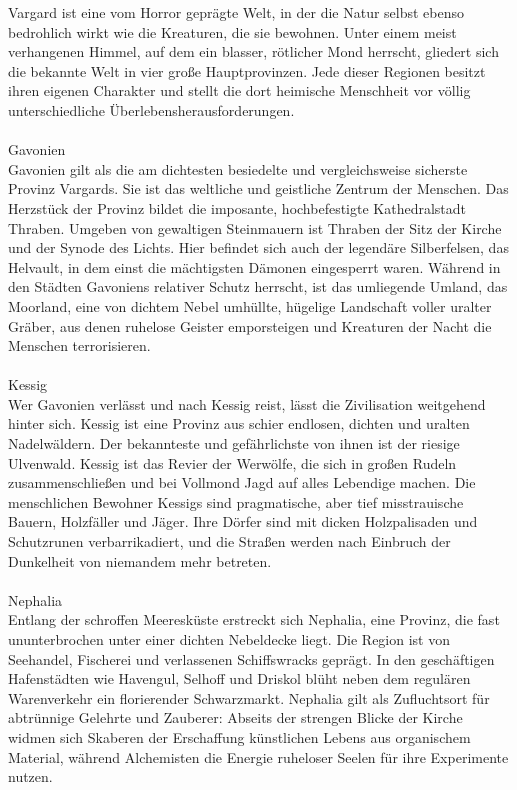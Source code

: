 \documentclass{book}
\begin{document}
Vargard ist eine vom Horror geprägte Welt, in der die Natur selbst ebenso bedrohlich wirkt wie die Kreaturen, die sie bewohnen. Unter einem meist verhangenen Himmel, auf dem ein blasser, rötlicher Mond herrscht, gliedert sich die bekannte Welt in vier große Hauptprovinzen. Jede dieser Regionen besitzt ihren eigenen Charakter und stellt die dort heimische Menschheit vor völlig unterschiedliche Überlebensherausforderungen.\\
\\
Gavonien\\
Gavonien gilt als die am dichtesten besiedelte und vergleichsweise sicherste Provinz Vargards. Sie ist das weltliche und geistliche Zentrum der Menschen. Das Herzstück der Provinz bildet die imposante, hochbefestigte Kathedralstadt Thraben. Umgeben von gewaltigen Steinmauern ist Thraben der Sitz der Kirche und der Synode des Lichts. Hier befindet sich auch der legendäre Silberfelsen, das Helvault, in dem einst die mächtigsten Dämonen eingesperrt waren. Während in den Städten Gavoniens relativer Schutz herrscht, ist das umliegende Umland, das Moorland, eine von dichtem Nebel umhüllte, hügelige Landschaft voller uralter Gräber, aus denen ruhelose Geister emporsteigen und Kreaturen der Nacht die Menschen terrorisieren.\\
\\
Kessig\\
Wer Gavonien verlässt und nach Kessig reist, lässt die Zivilisation weitgehend hinter sich. Kessig ist eine Provinz aus schier endlosen, dichten und uralten Nadelwäldern. Der bekannteste und gefährlichste von ihnen ist der riesige Ulvenwald. Kessig ist das Revier der Werwölfe, die sich in großen Rudeln zusammenschließen und bei Vollmond Jagd auf alles Lebendige machen. Die menschlichen Bewohner Kessigs sind pragmatische, aber tief misstrauische Bauern, Holzfäller und Jäger. Ihre Dörfer sind mit dicken Holzpalisaden und Schutzrunen verbarrikadiert, und die Straßen werden nach Einbruch der Dunkelheit von niemandem mehr betreten.\\
\\
Nephalia\\
Entlang der schroffen Meeresküste erstreckt sich Nephalia, eine Provinz, die fast ununterbrochen unter einer dichten Nebeldecke liegt. Die Region ist von Seehandel, Fischerei und verlassenen Schiffswracks geprägt. In den geschäftigen Hafenstädten wie Havengul, Selhoff und Driskol blüht neben dem regulären Warenverkehr ein florierender Schwarzmarkt. Nephalia gilt als Zufluchtsort für abtrünnige Gelehrte und Zauberer: Abseits der strengen Blicke der Kirche widmen sich Skaberen der Erschaffung künstlichen Lebens aus organischem Material, während Alchemisten die Energie ruheloser Seelen für ihre Experimente nutzen.\\
\end{document}
